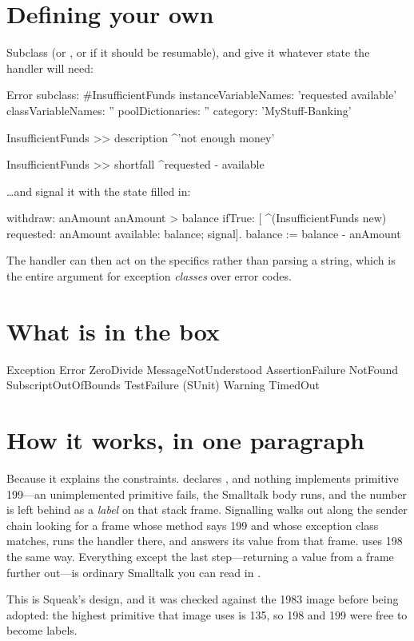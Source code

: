 \section{Defining your own}

Subclass  (or , or  if it should be
resumable), and give it whatever state the handler will need:

\begin{st}
Error subclass: #InsufficientFunds
    instanceVariableNames: 'requested available'
    classVariableNames: ''
    poolDictionaries: ''
    category: 'MyStuff-Banking'

InsufficientFunds >> description
    ^'not enough money'

InsufficientFunds >> shortfall
    ^requested - available
\end{st}

\ldots and signal it with the state filled in:

\begin{st}
withdraw: anAmount
    anAmount > balance ifTrue: [
        ^(InsufficientFunds new)
            requested: anAmount available: balance;
            signal].
    balance := balance - anAmount
\end{st}

The handler can then act on the specifics rather than parsing a string, which
is the entire argument for exception \emph{classes} over error codes.

\section{What is in the box}

\begin{plain}
Exception
    Error
        ZeroDivide
        MessageNotUnderstood
        AssertionFailure
        NotFound
        SubscriptOutOfBounds
        TestFailure          (SUnit)
    Warning
    TimedOut
\end{plain}

\section{How it works, in one paragraph}

Because it explains the constraints.  declares
, and nothing implements primitive 199---an unimplemented
primitive fails, the Smalltalk body runs, and the number is left behind as a
\emph{label} on that stack frame. Signalling walks out along the sender chain
looking for a frame whose method says 199 and whose exception class matches,
runs the handler there, and answers its value from that frame. 
uses 198 the same way. Everything except the last step---returning a value
from a frame further out---is ordinary Smalltalk you can read in
.

\begin{stnote}
This is Squeak's design, and it was checked against the 1983 image before
being adopted: the highest primitive that image uses is 135, so 198 and 199
were free to become labels.
\end{stnote}
